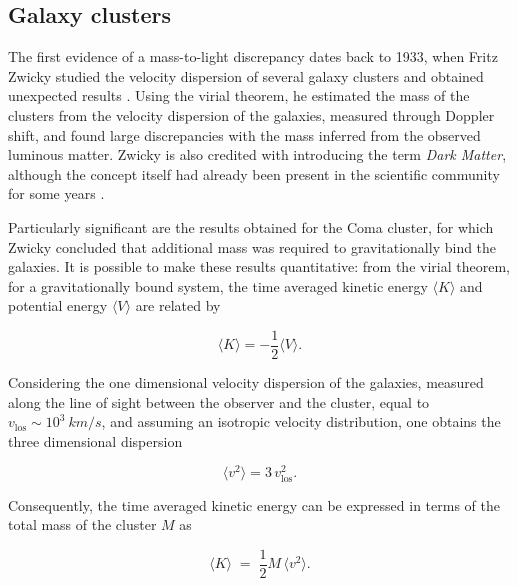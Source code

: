 
\subsection{Galaxy clusters}


The first evidence of a mass-to-light discrepancy dates back to 1933, when Fritz Zwicky studied the velocity dispersion of several galaxy clusters and obtained unexpected results \cite{Zwicky1933,Zwicky}.
Using the virial theorem, he estimated the mass of the clusters from the velocity dispersion of the galaxies, measured through Doppler shift, and found large discrepancies with the mass inferred from the observed luminous matter.
Zwicky is also credited with introducing the term \emph{Dark Matter}, although the concept itself had already been present in the scientific community for some years \cite{History}.

Particularly significant are the results obtained for the Coma cluster, for which Zwicky concluded that additional mass was required to gravitationally bind the galaxies.
It is possible to make these results quantitative: from the virial theorem, for a gravitationally bound system, the time averaged kinetic energy $\langle K \rangle$ and potential energy $\langle V \rangle$ are related by


\begin{equation}\label{eq:viriale}
\langle K \rangle = -\frac{1}{2}\langle V \rangle.
\end{equation}

Considering the one dimensional velocity dispersion of the galaxies, measured along the line of sight between the observer and the cluster, 
equal to $v_{\text{los}} \sim 10^{3}\ km/s$, and assuming an isotropic velocity distribution, one obtains the three dimensional dispersion


\begin{equation}
\langle v^{2}\rangle = 3\,v_{\text{los}}^{2}.
\end{equation}

Consequently, the time averaged kinetic energy can be expressed in terms of the total mass of the cluster $M$ as

\begin{equation} \label{Kinetic}
\langle K\rangle \;=\;\frac{1}{2}M\,\langle v^{2}\rangle.
\end{equation}

